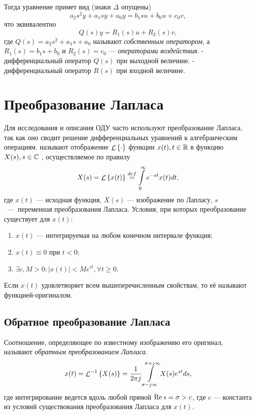 \documentclass[../../TAU.tex]{subfiles}
\begin{document}
    Тогда уравнение 
     примет вид (знаки $\Delta$ опущены)
    \begin{equation}
        a_2 s^2 y + a_1 s y + a_0 y = b_1 s u + b_0 u + c_0 v,
    \end{equation}
    что эквивалентно
    \begin{equation}
        Q(s) y = R_1(s)u + R_2(s)v,
    \end{equation}
    где 
    $Q(s) = a_2s^2 + a_1 s + a_0$ 
    называют {\it собственным оператором}, а 
    $R_1(s) = b_1s+b_0$ и 
    $R_2(s) = c_0$
     --- {\it операторами воздействия}.
     - дифференциальный оператор $Q(s)$ при выходной величине.
     - дифференциальный оператор $R(s)$ при входной величине.
\section{Преобразование Лапласа} %
    Для исследования и описания ОДУ часто используют преобразование Лапласа, так как оно сводит решение дифференциальных уравнений к алгебраическим операциям.
     называют отображение 
    $\mathop{\mathcal{L}}\nolimits\left\{\cdot\right\}$ 
    функции 
    $x(t), t\in\mathbb{R}$
     в функцию 
    $X(s), s\in\mathbb{C}$
    , осуществляемое по правилу
    \begin{equation}
        X(s) = \mathop{\mathcal{L}}\nolimits\left\{x(t)\right\} \stackrel{def}{=} \int\limits_0^\infty e^{-st} x(t) dt,
    \end{equation}
    где $x(t)$ --- исходная функция, $X(s)$ --- изображение по Лапласу, $s$~---~переменная преобразования Лапласа.
    Условия, при которых преобразование существует для $x(t)$:
    \begin{enumerate}
        \item $x(t)$ --- интегрируемая на любом конечном интервале функция;
        \item $x(t)\equiv0$ при $t < 0$;
        \item $\exists c, M > 0: |x(t)| < M e^{ct}, \forall t \ge 0$.
    \end{enumerate}
    Если $x(t)$ удовлетворяет всем вышеперечисленным свойствам, то её называют функцией-оригиналом.
\subsection{Обратное преобразование Лапласа} %
    Соотношение, определяющее по известному изображению его оригинал, называют {\it обратным преобразованием Лапласа}. 
    \begin{equation}
        x(t) = {\mathop{\mathcal{L}}\nolimits^{-1}\left\{X(s)\right\}} = \frac{1}{2\pi j} \int\limits_{\sigma-j\infty}^{\sigma + j\infty} X(s)e^{st} ds,
    \end{equation}
    где интегрирование ведется вдоль любой прямой 
    $\mathop{\mathrm{Re}}\nolimits{s} = \sigma > c$, 
    где $c$ --- константа из условий существования преобразования Лапласа для $x(t)$.
\end{document}
